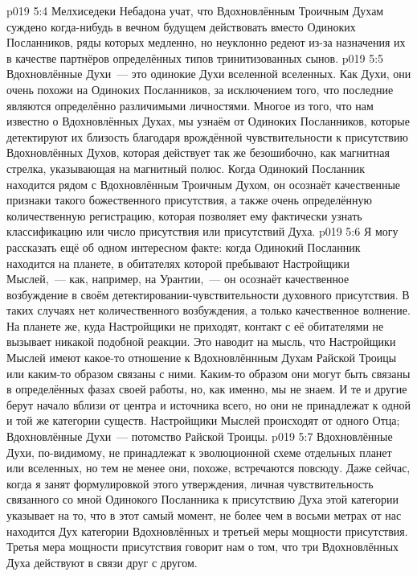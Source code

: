 \vs p019 5:4 Мелхиседеки Небадона учат, что Вдохновлённым Троичным Духам суждено когда\hyp{}нибудь в вечном будущем действовать вместо Одиноких Посланников, ряды которых медленно, но неуклонно редеют из-за назначения их в качестве партнёров определённых типов тринитизованных сынов.
\vs p019 5:5 \pc Вдохновлённые Духи~--- это одинокие Духи вселенной вселенных. Как Духи, они очень похожи на Одиноких Посланников, за исключением того, что последние являются определённо различимыми личностями. Многое из того, что нам известно о Вдохновлённых Духах, мы узнаём от Одиноких Посланников, которые детектируют их близость благодаря врождённой чувствительности к присутствию Вдохновлённых Духов, которая действует так же безошибочно, как магнитная стрелка, указывающая на магнитный полюс. Когда Одинокий Посланник находится рядом с Вдохновлённым Троичным Духом, он осознаёт качественные признаки такого божественного присутствия, а также очень определённую количественную регистрацию, которая позволяет ему фактически узнать классификацию или число присутствия или присутствий Духа.
\vs p019 5:6 Я могу рассказать ещё об одном интересном факте: когда Одинокий Посланник находится на планете, в обитателях которой пребывают Настройщики Мыслей,~--- как, например, на Урантии,~--- он осознаёт качественное возбуждение в своём детектировании\hyp{}чувствительности духовного присутствия. В таких случаях нет количественного возбуждения, а только качественное волнение. На планете же, куда Настройщики не приходят, контакт с её обитателями не вызывает никакой подобной реакции. Это наводит на мысль, что Настройщики Мыслей имеют какое\hyp{}то отношение к Вдохновлённным Духам Райской Троицы или каким\hyp{}то образом связаны с ними. Каким\hyp{}то образом они могут быть связаны в определённых фазах своей работы, но, как именно, мы не знаем. И те и другие берут начало вблизи от  центра и источника всего, но они не принадлежат к одной и той же категории существ. Настройщики Мыслей происходят от одного Отца; Вдохновлённые Духи~--- потомство Райской Троицы.
\vs p019 5:7 Вдохновлённые Духи, по\hyp{}видимому, не принадлежат к эволюционной схеме отдельных планет или вселенных, но тем не менее они, похоже, встречаются повсюду. Даже сейчас, когда я занят формулировкой этого утверждения, личная чувствительность связанного со мной Одинокого Посланника к присутствию Духа этой категории указывает на то, что в этот самый момент, не более чем в восьми метрах от нас находится Дух категории Вдохновлённых и третьей меры мощности присутствия. Третья мера мощности присутствия говорит нам о том, что три Вдохновлённых Духа действуют в связи друг с другом.
